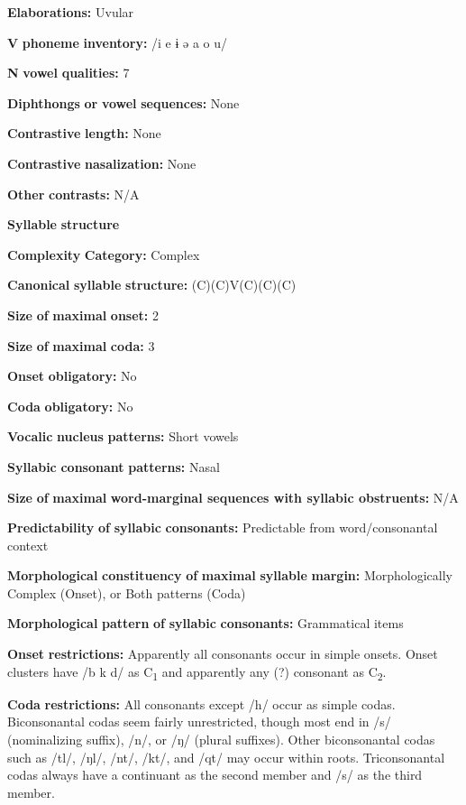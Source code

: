 \begin{styleBody}
\textbf{Elaborations:} Uvular

\textbf{V} \textbf{phoneme} \textbf{inventory:} /i e ɨ ə a o u/

\textbf{N} \textbf{vowel} \textbf{qualities:} 7

\textbf{Diphthongs} \textbf{or} \textbf{vowel} \textbf{sequences:} None

\textbf{Contrastive} \textbf{length:} None

\textbf{Contrastive} \textbf{nasalization:} None

\textbf{Other} \textbf{contrasts:} N/A

\textbf{Syllable} \textbf{structure}

\textbf{Complexity} \textbf{Category:} Complex

\textbf{Canonical} \textbf{syllable} \textbf{structure:} (C)(C)V(C)(C)(C) \citep[80-4]{Georg2007}

\textbf{Size} \textbf{of} \textbf{maximal} \textbf{onset:} 2

\textbf{Size} \textbf{of} \textbf{maximal} \textbf{coda:} 3

\textbf{Onset} \textbf{obligatory:} No

\textbf{Coda} \textbf{obligatory:} No

\textbf{Vocalic} \textbf{nucleus} \textbf{patterns:} Short vowels

\textbf{Syllabic} \textbf{consonant} \textbf{patterns:} Nasal

\textbf{Size} \textbf{of} \textbf{maximal} \textbf{word{}-marginal sequences with syllabic obstruents:} N/A

\textbf{Predictability} \textbf{of} \textbf{syllabic} \textbf{consonants:} Predictable from word/consonantal context

\textbf{Morphological} \textbf{constituency} \textbf{of} \textbf{maximal} \textbf{syllable} \textbf{margin:} Morphologically Complex (Onset), or Both patterns (Coda)

\textbf{Morphological} \textbf{pattern} \textbf{of} \textbf{syllabic} \textbf{consonants:} Grammatical items

\textbf{Onset} \textbf{restrictions:} Apparently all consonants occur in simple onsets. Onset clusters have /b k d/ as C\textsubscript{1} and apparently any (?) consonant as C\textsubscript{2}.

\textbf{Coda} \textbf{restrictions:} All consonants except /h/ occur as simple codas. Biconsonantal codas seem fairly unrestricted, though most end in /s/ (nominalizing suffix), /n/, or /ŋ/ (plural suffixes). Other biconsonantal codas such as /tl/, /ŋl/, /nt/, /kt/, and /qt/ may occur within roots. Triconsonantal codas always have a continuant as the second member and /s/ as the third member.


\end{styleBody}
